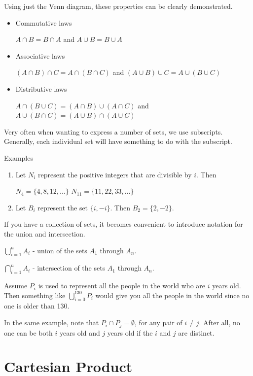 \documentclass[12pt]{article}
\begin{document}
Using just the Venn diagram, these properties can be clearly demonstrated.

\begin{itemize}
\item Commutative laws

$A \cap B = B \cap A$ and $A \cup B = B \cup A$

\item Associative laws

$(A \cap B) \cap C = A \cap (B \cap C)$ and $(A \cup B) \cup C = A \cup (B \cup C)$

\item Distributive laws

$A \cap (B \cup C) = (A \cap B) \cup (A \cap C)$ and $A \cup (B \cap C) = (A \cup B) \cap (A \cup C)$
\end{itemize}

Very often when wanting to express a number of sets, we use subscripts. 
Generally, each individual set will have something to do with the subscript.

Examples

\begin{enumerate}
\item Let $N_i$ represent the positive integers that are divisible by $i$. Then

$N_4 = \{4,8,12,\ldots\}$
$N_{11} = \{11, 22, 33, \ldots\}$

\item Let $B_i$ represent the set $\{i,-i\}$. Then $B_2 = \{2,-2\}$.
\end{enumerate}

If you have a collection of sets, it becomes convenient to introduce notation for the union and intersection.

$\displaystyle \bigcup_{i=1}^n A_i$ - union of the sets $A_1$ through $A_n$.

$\displaystyle \bigcap_{i=1}^n A_i$ - intersection of the sets $A_1$ through $A_n$.

Assume $P_i$ is used to represent all the people in the world who are $i$ years old. 
Then something like $\displaystyle \bigcup_{i=0}^{130} P_i$ would give you all the people in the world since no one is older than 130. 

In the same example, note that $P_i \cap P_j = \emptyset$, for any pair of $i \neq j$. After all, no one can be both $i$ years old and $j$ years old if the $i$ and $j$ are distinct.

\section*{Cartesian Product}
\end{document}
